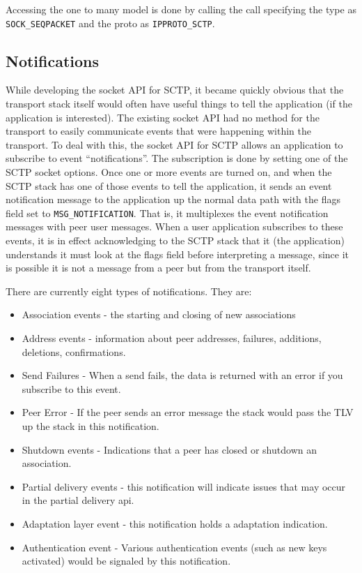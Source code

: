 \documentclass[conference]{IEEEtran}
\begin{document}
Accessing the one to many model is done by calling the call specifying the type as
\texttt{SOCK\_SEQPACKET} and the proto as \texttt{IPPROTO\_SCTP}.

\subsection{Notifications}

While developing the socket API for SCTP, it became quickly obvious
that the transport stack itself would often have useful things to tell the application 
(if the application is interested). The existing socket API had no method
for the transport to easily communicate events that were happening
within the transport. To deal with this, the socket API for SCTP allows an
application to subscribe to event ``notifications''. The subscription is
done by setting one of the SCTP socket options. Once one or more events are
turned on, and when the SCTP stack has one of those events to tell the application,
it sends an event notification message to the application up the normal data 
path with the flags field set to \texttt{MSG\_NOTIFICATION}. That is, it multiplexes 
the event notification messages with peer user messages.  When a user application
subscribes to these events, it is in effect acknowledging to the SCTP stack that it
(the application) understands it must look at the flags field before interpreting
a message, since it is possible it is not a message from a peer but from the transport
itself.

There are currently eight types of notifications. They are:
\begin{itemize}
 \item  Association events - the starting and closing of new associations
 \item  Address events - information about peer addresses, failures, additions, deletions, confirmations.
 \item  Send Failures - When a send fails, the data is returned with an error if you subscribe to this event.
 \item  Peer Error - If the peer sends an error message the stack would pass the TLV up the stack in this notification.
 \item  Shutdown events - Indications that a peer has closed or shutdown an association.
 \item  Partial delivery events - this notification will indicate issues that may occur in the partial delivery api.
 \item  Adaptation layer event - this notification holds a adaptation indication.
 \item  Authentication event - Various authentication events (such as new keys activated) would be signaled by this notification.
 \end{itemize}
\end{document}
